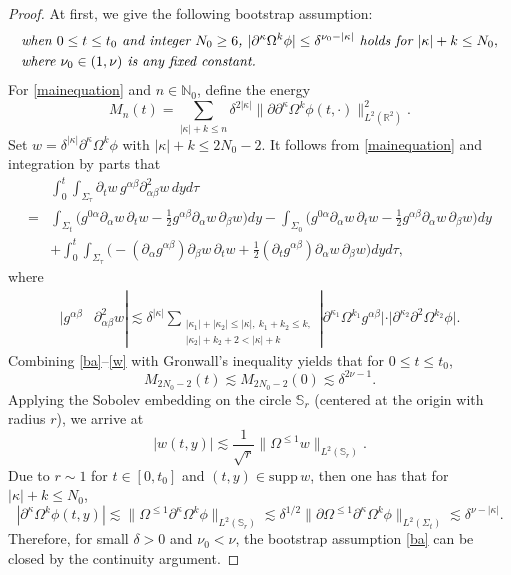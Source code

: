 \documentclass[11pt,twoside]{article}
\begin{document}
\begin{proof}
At first, we give the following bootstrap assumption:
\begin{equation}\label{ba}
\begin{split}
&\text{\it when $0\leq t\leq t_0$ and integer $N_0\ge 6$,
$|\partial^\kappa\Omega^k\phi|\leq\delta^{\nu_0-|\kappa|}$ holds for $|\kappa|+k\leq N_0$},\\
&\text{\it where $\nu_0\in(1, \nu)$ is any fixed constant.}
\end{split}
\end{equation}
For \eqref{mainequation} and $n\in\mathbb N_0$, define the energy
$$
M_n(t)=\sum_{|\kappa|+k\leq n}\delta^{2|\kappa|}\|\partial\partial^\kappa\Omega^k\phi(t,\cdot)\|_{L^2(\mathbb R^2)}^2.
$$
Set $w=\delta^{|\kappa|}\partial^\kappa\Omega^k\phi$ with $|\kappa|+k\leq 2N_0-2$.
It follows from \eqref{mainequation} and integration by parts that
\begin{equation}\label{Y-4}
\begin{split}
&\int_0^t\int_{\Sigma_\tau}\partial_t w\,g^{\alpha\beta}\partial_{\alpha\beta}^2 w\,dyd\tau\\
=&\int_{\Sigma_{t}}\big(g^{0\alpha}\partial_\alpha w\,\partial_t w
-\frac12g^{\alpha\beta}\partial_\alpha w\,\partial_\beta w\big)dy
-\int_{\Sigma_{0}}\big(g^{0\alpha}\partial_\alpha w\,\partial_t w
-\frac12g^{\alpha\beta}\partial_\alpha w\,\partial_\beta w\big)dy\\
&+\int_0^t\int_{\Sigma_\tau}\big(-(\partial_\alpha g^{\alpha\beta})\partial_\beta w\,\partial_t w
+\frac12(\partial_t g^{\alpha\beta})\partial_\alpha w\,\partial_\beta w\big)dyd\tau,
\end{split}
\end{equation}
where
\begin{equation}\label{w}
\begin{split}
|g^{\alpha\beta}&\partial_{\alpha\beta}^2w|
\lesssim\delta^{|\kappa|}\sum_{\substack{
|\kappa_1|+|\kappa_2|\leq|\kappa|,\ k_1+k_2\leq k,\\
|\kappa_2|+k_2+2<|\kappa|+k}}
|\partial^{\kappa_1}\Omega^{k_1}g^{\alpha\beta}|
\cdot|\partial^{\kappa_2}\partial^2\Omega^{k_2}\phi|.
\end{split}
\end{equation}
Combining \eqref{ba}--\eqref{w} with Gronwall's inequality yields that for $0\leq t\leq t_0$,
$$
M_{2N_0-2}(t)\lesssim M_{2N_0-2}(0)\lesssim\delta^{2\nu-1}.
$$
Applying the Sobolev embedding on the circle $\mathbb S_r$ (centered at the origin with radius $r$), we arrive at
$$
|w(t,y)|\lesssim \frac{1}{\sqrt{r}}\|\Omega^{\le 1}w\|_{L^2(\mathbb S_r)}.
$$
Due to $r\sim 1$ for $t\in[0,t_0]$ and $(t,y)\in\mathrm{supp}\,w$, then one has that for $|\kappa|+k\leq N_0$,
\begin{equation}\label{local}
|\partial^\kappa\Omega^k\phi(t,y)|
\lesssim \|\Omega^{\le 1}\partial^\kappa\Omega^k\phi\|_{L^2(\mathbb S_r)}
\lesssim\delta^{1/2}\|\partial\Omega^{\le 1}\partial^\kappa\Omega^k\phi\|_{L^2(\Sigma_{t})}
\lesssim\delta^{\nu-|\kappa|}.
\end{equation}
Therefore, for small $\delta>0$ and $\nu_0<\nu$, the bootstrap assumption \eqref{ba} can be closed by the continuity argument.



\end{proof}
\end{document}

